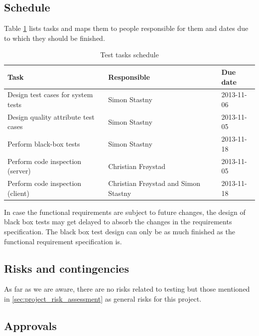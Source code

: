 \documentclass[11pt]{book}
\begin{document}
\subsection{Schedule}

Table \ref{tab:test_plan_schedule} lists tasks and maps them to people responsible for them and dates due to which they should be finished. 

\begin{table}[H]
    \centering
    \begin{tabular}{| l | l | l |}
        \hline
        Task                                & Responsible                           & Due date       \\ \hline
        Design test cases for system tests  & Simon Stastny                         & 2013-11-06     \\ \hline
        Design quality attribute test cases & Simon Stastny                         & 2013-11-05     \\ \hline
        Perform black-box tests             & Simon Stastny                         & 2013-11-18     \\ \hline
        Perform code inspection (server)    & Christian Frøystad                    & 2013-11-05     \\ \hline
        Perform code inspection (client)    & Christian Frøystad and Simon Stastny  & 2013-11-18     \\ \hline
    \end{tabular}
    \caption{Test tasks schedule}
    \label{tab:test_plan_schedule}
\end{table}

In case the functional requirements are subject to future changes, the design of black box tests may get delayed to absorb the changes in the requirements specification. The black box test design can only be as much finished as the functional requirement specification is.

\subsection{Risks and contingencies}
As far as we are aware, there are no risks related to testing but those mentioned in \ref{sec:project_risk_assessment} as general risks for this project.

\subsection{Approvals}
\end{document}
